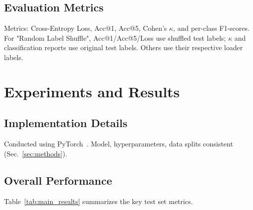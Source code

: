 \documentclass[10pt,twocolumn,letterpaper]{article}
\begin{document}
\subsection{Evaluation Metrics}
Metrics: Cross-Entropy Loss, Acc@1, Acc@5, Cohen's $\kappa$, and per-class F1-scores.
For "Random Label Shuffle", Acc@1/Acc@5/Loss use shuffled test labels; $\kappa$ and classification reports use original test labels. Others use their respective loader labels.

\section{Experiments and Results} %
\label{sec:experiments_results}

\subsection{Implementation Details}
Conducted using PyTorch~\cite{Paszke2019PyTorchAI}. Model, hyperparameters, data splits consistent (Sec.~\ref{sec:methods}).

\subsection{Overall Performance}
Table~\ref{tab:main_results} summarizes the key test set metrics.

\begin{table*}[htbp!] %
    \centering
    \caption{Test set performance. "Loss", "Acc@1", "Acc@5" are on loader labels. "Cohen's $\kappa$" for "Shuffle" is vs. original labels. Best Acc@1, Acc@5, $\kappa$ bolded; lowest Loss (excl. Shuffle) bolded.}
    \label{tab:main_results}
\end{table*}
\end{document}
